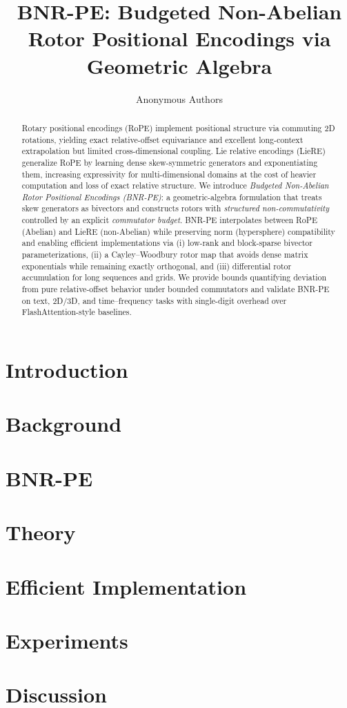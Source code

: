 \documentclass[11pt]{article}
\title{\textbf{BNR-PE: Budgeted Non-Abelian Rotor Positional Encodings via Geometric Algebra}}
\author{Anonymous Authors}
\date{}
\begin{document}
\maketitle

\begin{abstract}
Rotary positional encodings (RoPE) implement positional structure via commuting 2D rotations, yielding exact relative-offset equivariance and excellent long-context extrapolation but limited cross-dimensional coupling. Lie relative encodings (LieRE) generalize RoPE by learning dense skew-symmetric generators and exponentiating them, increasing expressivity for multi-dimensional domains at the cost of heavier computation and loss of exact relative structure. We introduce \emph{Budgeted Non-Abelian Rotor Positional Encodings (BNR-PE)}: a geometric-algebra formulation that treats skew generators as bivectors and constructs rotors with \emph{structured non-commutativity} controlled by an explicit \emph{commutator budget}. BNR-PE interpolates between RoPE (Abelian) and LieRE (non-Abelian) while preserving norm (hypersphere) compatibility and enabling efficient implementations via (i) low-rank and block-sparse bivector parameterizations, (ii) a Cayley--Woodbury rotor map that avoids dense matrix exponentials while remaining exactly orthogonal, and (iii) differential rotor accumulation for long sequences and grids. We provide bounds quantifying deviation from pure relative-offset behavior under bounded commutators and validate BNR-PE on text, 2D/3D, and time--frequency tasks with single-digit overhead over FlashAttention-style baselines.
\end{abstract}

\section{Introduction}


\section{Background}


\section{BNR-PE}


\section{Theory}


\section{Efficient Implementation}


\section{Experiments}


\section{Discussion}





\appendix

\end{document}
